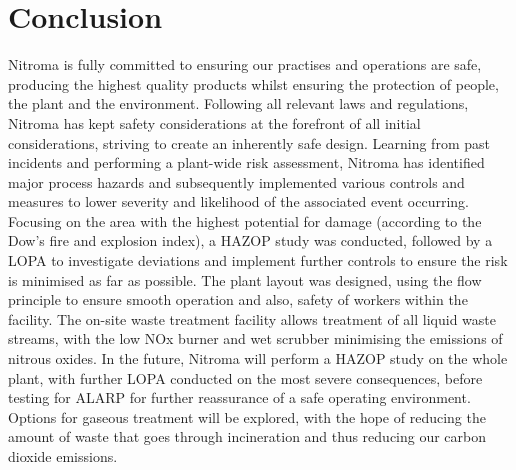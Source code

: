 \section{Conclusion}

Nitroma is fully committed to ensuring our practises and operations are safe, producing the highest quality products whilst ensuring the protection of people, the plant and the environment. Following all relevant laws and regulations, Nitroma has kept safety considerations at the forefront of all initial considerations, striving to create an inherently safe design. Learning from past incidents and performing a plant-wide risk assessment, Nitroma has identified major process hazards and subsequently implemented various controls and measures to lower severity and likelihood of the associated event occurring. Focusing on the area with the highest potential for damage (according to the Dow’s fire and explosion index), a HAZOP study was conducted, followed by a LOPA to investigate deviations and implement further controls to ensure the risk is minimised as far as possible. The plant layout was designed, using the flow principle to ensure smooth operation and also, safety of workers within the facility. The on-site waste treatment facility allows treatment of all liquid waste streams, with the low NOx burner and wet scrubber minimising the emissions of nitrous oxides. In the future, Nitroma will perform a HAZOP study on the whole plant, with further LOPA conducted on the most severe consequences, before testing for ALARP for further reassurance of a safe operating environment. Options for gaseous treatment will be explored, with the hope of reducing the amount of waste that goes through incineration and thus reducing our carbon dioxide emissions. 